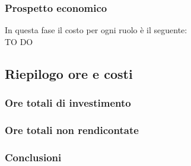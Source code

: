		\subsubsection{Prospetto economico} %
		\label{ssub:prospetto_economico}
		In questa fase il costo per ogni ruolo è il seguente: \\
		TO DO
		
	
	\subsection{Riepilogo ore e costi} %
	\label{sub:riepilogo_ore_e_costi}
		\subsubsection{Ore totali di investimento} %
		\label{ssub:ore_totali_di_investimento}
		
		
		\subsubsection{Ore totali non rendicontate} %
		\label{ssub:ore_totali_non_rendicontate}
		
		
		\subsubsection{Conclusioni} %
		\label{ssub:conclusioni}
		
		
	
